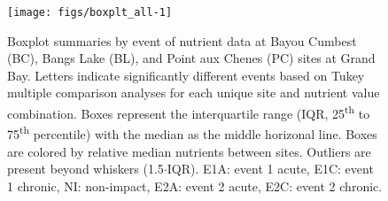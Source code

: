 \documentclass[letterpaper,12pt]{article}\usepackage[]{graphicx}\usepackage[]{color}
\makeatletter
\def\maxwidth{ %
  \ifdim\Gin@nat@width>\linewidth
    \linewidth
  \else
    \Gin@nat@width
  \fi
}
\makeatother
\begin{document}
\begin{figure}[!ht]

{\centering \texttt{[image: figs/boxplt\_all-1]} 

}

\caption[Boxplot summaries by event of nutrient data at Bayou Cumbest (BC), Bangs Lake (BL), and Point aux Chenes (PC) sites at Grand Bay]{Boxplot summaries by event of nutrient data at Bayou Cumbest (BC), Bangs Lake (BL), and Point aux Chenes (PC) sites at Grand Bay.  Letters indicate significantly different events based on Tukey multiple comparison analyses for each unique site and nutrient value combination.  Boxes represent the interquartile range (IQR, 25\textsuperscript{th} to 75\textsuperscript{th} percentile) with the median as the middle horizonal line.  Boxes are colored by relative median nutrients between sites.  Outliers are present beyond whiskers (1.5$\cdot$IQR). E1A: event 1 acute, E1C: event 1 chronic, NI: non-impact, E2A: event 2 acute, E2C: event 2 chronic.}\label{fig:boxplt_all}
\end{figure}
\end{document}
